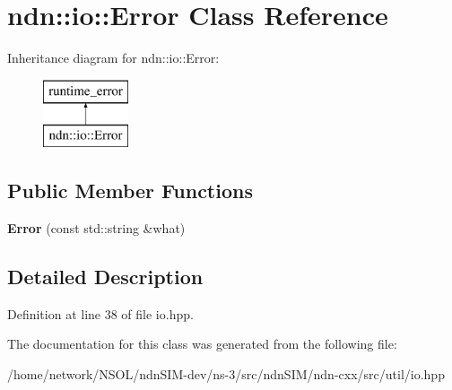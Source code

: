 \hypertarget{classndn_1_1io_1_1Error}{}\section{ndn\+:\+:io\+:\+:Error Class Reference}
\label{classndn_1_1io_1_1Error}
Inheritance diagram for ndn\+:\+:io\+:\+:Error\+:\begin{figure}[H]
\begin{center}
\leavevmode
\includegraphics[height=2.000000cm]{classndn_1_1io_1_1Error}
\end{center}
\end{figure}
\subsection*{Public Member Functions}
\begin{DoxyCompactItemize}
\item 
{\bfseries Error} (const std\+::string \&what)\hypertarget{classndn_1_1io_1_1Error_a18926aafcc25bd13dd3401051e874323}{}\label{classndn_1_1io_1_1Error_a18926aafcc25bd13dd3401051e874323}

\end{DoxyCompactItemize}


\subsection{Detailed Description}


Definition at line 38 of file io.\+hpp.



The documentation for this class was generated from the following file\+:\begin{DoxyCompactItemize}
\item 
/home/network/\+N\+S\+O\+L/ndn\+S\+I\+M-\/dev/ns-\/3/src/ndn\+S\+I\+M/ndn-\/cxx/src/util/io.\+hpp\end{DoxyCompactItemize}
